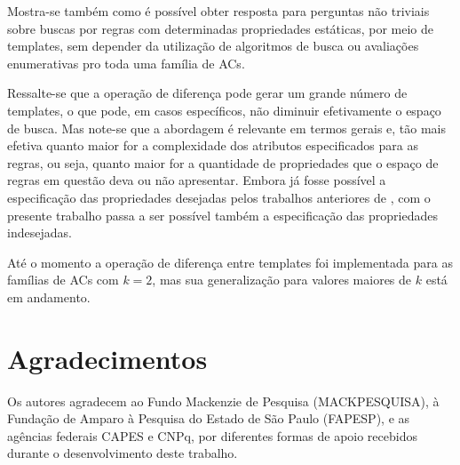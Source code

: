 \documentclass[12pt, a4paper]{article}
\begin{document}
Mostra-se também como é possível obter resposta para perguntas não triviais sobre buscas por regras com determinadas propriedades estáticas, por meio de templates, sem depender da utilização de algoritmos de busca ou avaliações  enumerativas pro toda uma família de ACs.

Ressalte-se que a operação de diferença pode gerar um grande número de templates, o que pode, em casos específicos, não diminuir efetivamente o espaço de busca. Mas note-se que a abordagem é relevante em termos gerais e, tão mais efetiva quanto maior for a complexidade dos atributos especificados para as regras, ou seja, quanto maior for a quantidade de propriedades que o espaço de regras em questão deva ou não apresentar. Embora já fosse possível a especificação das propriedades desejadas pelos trabalhos anteriores de \cite{deOliveira2014,deOliveira2014b}%
, com o presente trabalho passa a ser possível também a especificação das propriedades indesejadas.

Até o momento a operação de diferença entre templates foi implementada para as famílias de ACs com $k=2$, mas sua generalização para valores maiores de $k$ está em andamento.

\section*{Agradecimentos}
\label{sec:agrdecimentos}
Os autores agradecem ao Fundo Mackenzie de Pesquisa (MACKPESQUISA), à Fundação de Amparo à Pesquisa do Estado de São Paulo (FAPESP), e as agências federais CAPES e CNPq, por diferentes formas de apoio recebidos durante o desenvolvimento deste trabalho.

\def\refname{REFERÊNCIAS BIBLIOGRÁFICAS}


\end{document}

